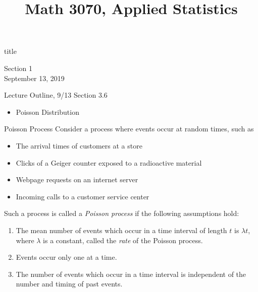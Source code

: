 \documentclass[]{beamer}
\title{Math 3070, Applied Statistics}
\newcommand{\nl}[1]{\vspace{#1 em}}
\begin{document}
\begin{frame}
    \begin{beamercolorbox}[rounded=true,wd=\textwidth,center]{title}
        \inserttitle
    \end{beamercolorbox}
    \begin{center}
        Section 1\\
        \nl{0.5}
        September 13, 2019
    \end{center}
\end{frame}

\begin{frame}{Lecture Outline, 9/13}
    Section 3.6
    \begin{itemize}
        \item Poisson Distribution
    \end{itemize}
\end{frame}

\begin{frame}{Poisson Process}
    Consider a process where events occur at random times, such as
    \begin{itemize}
    \item The arrival times of customers at a store
    \item Clicks of a Geiger counter exposed to a radioactive material
    \item Webpage requests on an internet server
    \item Incoming calls to a customer service center
    \end{itemize}
    \pause Such a process is called a \emph{Poisson process} if the following assumptions hold:
    \begin{enumerate}
    \item The mean number of events which occur in a time interval of length $t$ is $\lambda t$, where $\lambda$ is a constant, called the \emph{rate} of the Poisson process.
    \item Events occur only one at a time.
    \item The number of events which occur in a time interval is independent of the number and timing of past events.
    \end{enumerate}
    \end{frame}
    
\end{document}
